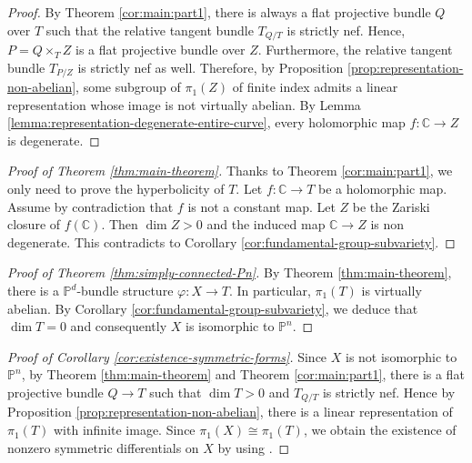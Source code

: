 \documentclass[english,reqno]{amsart}
\newcommand\bbC{{\mathbb C}}
\newcommand\bbP{{\mathbb P}}
\theoremstyle{plain}
\theoremstyle{definition}
\numberwithin{equation}{section} %
\begin{document}
\begin{proof}
	By Theorem \ref{cor:main:part1}, there is always a flat projective bundle $Q$ over $T$ such that the relative tangent bundle $T_{Q/T}$ is strictly nef. Hence,   $P=Q\times_T Z$ is a flat projective bundle over $Z$. Furthermore, the relative tangent bundle $T_{P/Z}$ is strictly nef as well.
	Therefore, by  Proposition \ref{prop:representation-non-abelian}, some   subgroup of $\pi_1(Z)$ of finite index admits a linear representation whose image is not virtually abelian. By Lemma \ref{lemma:representation-degenerate-entire-curve}, every holomorphic map $f:\bbC\rightarrow Z$ is degenerate.
\end{proof}



\baselineskip

\begin{proof}[{Proof of Theorem \ref{thm:main-theorem}}]
	Thanks to Theorem \ref{cor:main:part1}, we only need  to prove the hyperbolicity of $T$.
	Let  $f\colon \bbC\rightarrow T$ be a holomorphic map. 
	Assume by contradiction that $f$ is not a constant map. Let $Z$ be the Zariski closure of $f(\bbC)$. Then $\dim Z >0$ and the induced map $\bbC \to Z$ is non degenerate. 
	This contradicts to Corollary \ref{cor:fundamental-group-subvariety}.
\end{proof}


\begin{proof}[{Proof of Theorem  \ref{thm:simply-connected-Pn}}]
	By Theorem \ref{thm:main-theorem}, there is a $\bbP^d$-bundle structure $\varphi\colon X\to T$. In particular, $\pi_1(T)$ is virtually abelian. By Corollary \ref{cor:fundamental-group-subvariety}, we deduce that $\dim T=0$ and consequently $X$ is isomorphic to $\bbP^n$.
\end{proof}


\begin{proof}[Proof of Corollary \ref{cor:existence-symmetric-forms}]
	Since $X$ is not isomorphic to $\bbP^n$, by Theorem \ref{thm:main-theorem} and Theorem \ref{cor:main:part1}, there is a flat projective bundle $Q\rightarrow T$ such that $\dim T>0$ and $T_{Q/T}$ is strictly nef. Hence by Proposition \ref{prop:representation-non-abelian}, there is a linear representation of $\pi_1(T)$ with infinite image. Since $\pi_1(X) \cong \pi_1(T)$,  we obtain  the existence of nonzero symmetric differentials on $X$ by using \cite[Theorem 0.1]{BrunebarbeKlinglerTotaro2013}.
\end{proof}


\baselineskip


\def\cprime{$'$} %

\renewcommand\refname{Reference}


\end{document}
